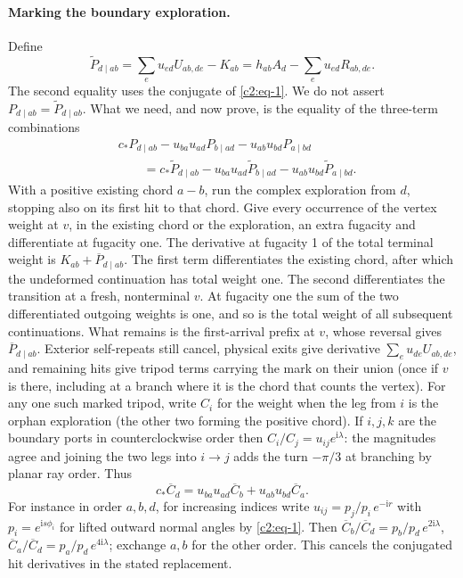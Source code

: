 \paragraph{Marking the boundary exploration.}
Define
\[
 \widetilde P_{d\mid ab}
 =\sum_e u_{ed}U_{ab,de}-K_{ab}
 =h_{ab}A_d-\sum_e u_{ed}R_{ab,de}.
\]
The second equality uses the conjugate of \eqref{c2:eq-1}. We do not
assert \(P_{d\mid ab}=\widetilde P_{d\mid ab}\). What we need, and now
prove, is the equality of the three-term combinations
\[
\begin{aligned}
 &c_*P_{d\mid ab}-u_{ba}u_{ad}P_{b\mid ad}-u_{ab}u_{bd}P_{a\mid bd}\\
 &\qquad=c_*\widetilde P_{d\mid ab}
 -u_{ba}u_{ad}\widetilde P_{b\mid ad}
 -u_{ab}u_{bd}\widetilde P_{a\mid bd}.
\end{aligned}
\]
With a positive existing chord \(a-b\), run the complex exploration from
\(d\), stopping also on its first hit to that chord. Give every occurrence
of the vertex weight at \(v\), in the existing chord or the exploration,
an extra fugacity and differentiate at fugacity one. The derivative at fugacity 1 of the total terminal weight is \(K_{ab}+\overline P_{d\mid ab}\). The first term differentiates the existing chord, after which the
undeformed continuation has total weight one. The second differentiates the
transition at a fresh, nonterminal \(v\). At fugacity one the sum of
the two differentiated outgoing weights is one, and so is the total
weight of all subsequent continuations. What remains is the first-arrival
prefix at \(v\), whose reversal gives \(\overline P_{d\mid ab}\). Exterior self-repeats still cancel, physical exits give derivative \(\sum_e u_{de}U_{ab,de}\), and remaining hits give tripod terms carrying the mark on their union (once if \(v\) is there, including at a branch where it is the chord that counts the vertex). For any one such marked tripod, write \(C_i\) for the weight when the leg from \(i\) is the orphan exploration (the other two forming the positive chord). If \(i,j,k\) are the boundary ports in counterclockwise order then \(C_i/C_j=u_{ij}e^{\mathrm i\lambda}\): the magnitudes agree and joining the two legs into \(i\to j\) adds the turn \(-\pi/3\) at branching by planar ray order. Thus
\[
 c_*\overline C_d=u_{ba}u_{ad}\overline C_b+u_{ab}u_{bd}\overline C_a .
\]
For instance in order \(a,b,d\), for increasing indices write \(u_{ij}=p_j/p_i\,e^{-\mathrm i r}\) with \(p_i=e^{\mathrm i s\phi_i}\) for lifted outward normal angles by \eqref{c2:eq-1}. Then \(\overline C_b/\overline C_d=p_b/p_d\,e^{2\mathrm i\lambda}\), \(\overline C_a/\overline C_d=p_a/p_d\,e^{4\mathrm i\lambda}\); exchange \(a,b\) for the other order. This cancels the conjugated hit derivatives in the stated replacement.

